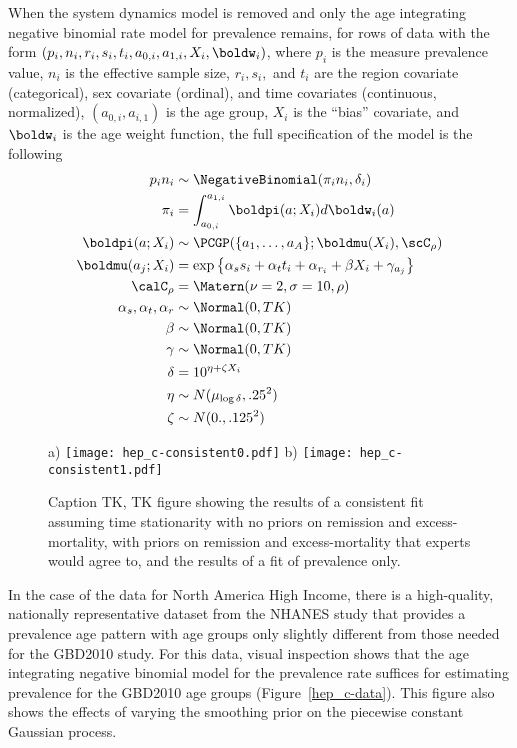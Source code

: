 When the system dynamics model is removed and only the age integrating
negative binomial rate model for prevalence remains, for rows of data
with the form $(p_i, n_i, r_i, s_i, t_i, a_{0,i}, a_{1,i}, X_i,
\boldw_i)$, where $p_i$ is the measure prevalence value, $n_i$ is the
effective sample size, $r_i, s_i,$ and $t_i$ are the region covariate
(categorical), sex covariate (ordinal), and time covariates
(continuous, normalized), $(a_{0,i}, a_{i,1})$ is the age group, $X_i$
is the ``bias'' covariate, and $\boldw_i$ is the age weight function,
the full specification of the model is the following
\begin{align*}
p_i n_i &\sim \NegativeBinomial(\pi_i n_i, \delta_i)\\
\pi_i &= \int_{a_{0,i}}^{a_{1,i}} \boldpi(a; X_i)d\boldw_i(a)\\
\boldpi(a; X_i) &\sim \PCGP(\{a_1, \ldots, a_A\}; \boldmu(X_i), \scC_\rho)\\
\boldmu(a_j; X_i) &= \exp\left\{\alpha_s s_i + \alpha_t t_i + \alpha_{r_i} +
\beta X_i + \gamma_{a_j}\right\}\\
\calC_\rho &= \Matern(\nu=2, \sigma=10, \rho)\\
\alpha_s, \alpha_t, \alpha_r &\sim \Normal(0, TK)\\
\beta &\sim \Normal(0, TK)\\
\gamma &\sim \Normal(0, TK)\\
\delta &= 10^{\eta + \zeta X_i}\\
\eta &\sim N(\mu_{\log \delta}, .25^2)\\
\zeta &\sim N(0., .125^2)
\end{align*}

\begin{figure}
\begin{center}
a)
\texttt{[image: hep\_c-consistent0.pdf]}
b)
\texttt{[image: hep\_c-consistent1.pdf]}
\end{center}
\caption{Caption TK, TK figure showing the results of a consistent fit
  assuming time stationarity with no priors on remission and
  excess-mortality, with priors on remission and excess-mortality that
  experts would agree to, and the results of a fit of prevalence only.
}
\label{hep_c-consistent}
\end{figure}

In the case of the data for North America High Income, there is a
high-quality, nationally representative dataset from the NHANES study
that provides a prevalence age pattern with age groups only slightly
different from those needed for the GBD2010 study.  For this data,
visual inspection shows that the age integrating negative binomial
model for the prevalence rate suffices for estimating prevalence for
the GBD2010 age groups (Figure~\ref{hep_c-data}).  
This figure also shows the effects of varying the smoothing prior on
the piecewise constant Gaussian process.

